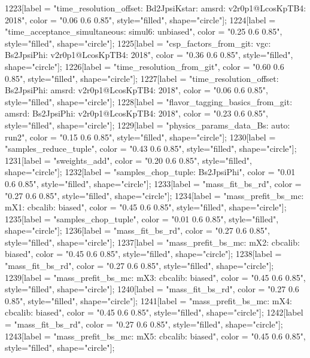 {	1223[label = "time_resolution_offset\nmode: Bd2JpsiKstar\ntimeres: amsrd\nversion: v2r0p1@LcosKpTB4\nyear: 2018", color = "0.06 0.6 0.85", style="filled", shape="circle"];
	1224[label = "time_acceptance_simultaneous\ntimeacc: simul6\ntrigger: unbiased", color = "0.25 0.6 0.85", style="filled", shape="circle"];
	1225[label = "csp_factors_from_git\ncsp: vgc\nmode: Bs2JpsiPhi\nversion: v2r0p1@LcosKpTB4\nyear: 2018", color = "0.36 0.6 0.85", style="filled", shape="circle"];
	1226[label = "time_resolution_from_git", color = "0.60 0.6 0.85", style="filled", shape="circle"];
	1227[label = "time_resolution_offset\nmode: Bs2JpsiPhi\ntimeres: amsrd\nversion: v2r0p1@LcosKpTB4\nyear: 2018", color = "0.06 0.6 0.85", style="filled", shape="circle"];
	1228[label = "flavor_tagging_basics_from_git\nflavor: amsrd\nmode: Bs2JpsiPhi\nversion: v2r0p1@LcosKpTB4\nyear: 2018", color = "0.23 0.6 0.85", style="filled", shape="circle"];
	1229[label = "physics_params_data_Bs\nfit: auto\nyear: run2", color = "0.15 0.6 0.85", style="filled", shape="circle"];
	1230[label = "samples_reduce_tuple", color = "0.43 0.6 0.85", style="filled", shape="circle"];
	1231[label = "sweights_add", color = "0.20 0.6 0.85", style="filled", shape="circle"];
	1232[label = "samples_chop_tuple\nmode: Bs2JpsiPhi", color = "0.01 0.6 0.85", style="filled", shape="circle"];
	1233[label = "mass_fit_bs_rd", color = "0.27 0.6 0.85", style="filled", shape="circle"];
	1234[label = "mass_prefit_bs_mc\nmassbin: mX1\nmassmodel: cbcalib\ntrigger: biased", color = "0.45 0.6 0.85", style="filled", shape="circle"];
	1235[label = "samples_chop_tuple", color = "0.01 0.6 0.85", style="filled", shape="circle"];
	1236[label = "mass_fit_bs_rd", color = "0.27 0.6 0.85", style="filled", shape="circle"];
	1237[label = "mass_prefit_bs_mc\nmassbin: mX2\nmassmodel: cbcalib\ntrigger: biased", color = "0.45 0.6 0.85", style="filled", shape="circle"];
	1238[label = "mass_fit_bs_rd", color = "0.27 0.6 0.85", style="filled", shape="circle"];
	1239[label = "mass_prefit_bs_mc\nmassbin: mX3\nmassmodel: cbcalib\ntrigger: biased", color = "0.45 0.6 0.85", style="filled", shape="circle"];
	1240[label = "mass_fit_bs_rd", color = "0.27 0.6 0.85", style="filled", shape="circle"];
	1241[label = "mass_prefit_bs_mc\nmassbin: mX4\nmassmodel: cbcalib\ntrigger: biased", color = "0.45 0.6 0.85", style="filled", shape="circle"];
	1242[label = "mass_fit_bs_rd", color = "0.27 0.6 0.85", style="filled", shape="circle"];
	1243[label = "mass_prefit_bs_mc\nmassbin: mX5\nmassmodel: cbcalib\ntrigger: biased", color = "0.45 0.6 0.85", style="filled", shape="circle"];
}
